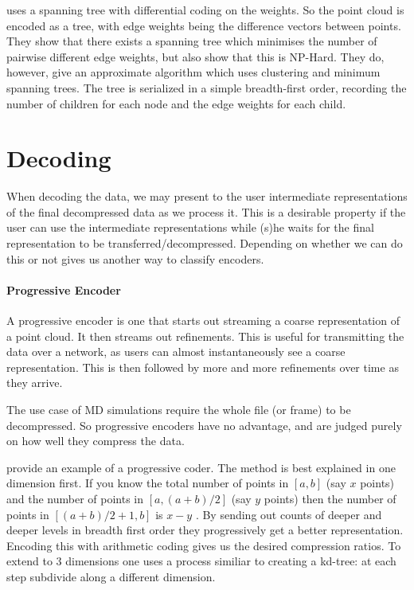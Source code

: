 \documentclass[a4paper]{report}
\begin{document}
\citet{chen2005lcp} uses a spanning tree with differential coding on the
weights. So the point cloud is encoded as a tree, with edge weights being the
difference vectors between points. They show that there exists a spanning tree
which minimises the number of pairwise different edge weights, but also show
that this is NP-Hard. They do, however, give an approximate algorithm which
uses clustering and minimum spanning trees. The tree is serialized in a simple
breadth-first order, recording the number of children for each node and the
edge weights for each child.


\section{Decoding}

When decoding the data, we may present to the user intermediate
representations of the final decompressed data as we process it. This is a
desirable property if the user can use the intermediate representations while
(s)he waits for the final representation to be
transferred/decompressed. Depending on whether we can do this or not gives us
another way to classify encoders.

\paragraph{Progressive Encoder}
A progressive encoder is one that starts out streaming a coarse representation
of a point cloud. It then streams out refinements. This is useful for
transmitting the data over a network, as users can almost instantaneously see
a coarse representation. This is then followed by more and more refinements
over time as they arrive.

The use case of MD simulations require the whole file (or frame) to be
decompressed. So progressive encoders have no advantage, and are judged purely
on how well they compress the data.

\citet{devillers2000gci} provide an example of a progressive coder. The method
is best explained in one dimension first. If you know the total number of
points in $[a, b]$ (say $x$ points) and the number of points in $[a, (a+b)/2]$
(say $y$ points) then the number of points in $[(a+b)/2+1, b]$ is $x - y$ . By
sending out counts of deeper and deeper levels in breadth first order they
progressively get a better representation. Encoding this with arithmetic
coding gives us the desired compression ratios. To extend to 3 dimensions one
uses a process similiar to creating a kd-tree: at each step subdivide along a
different dimension.
\end{document}
